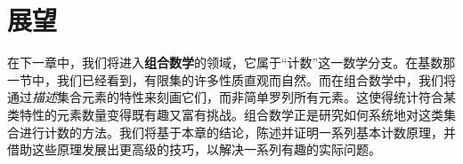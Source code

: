 \section{展望}

在下一章中，我们将进入\textbf{组合数学}的领域，它属于``计数''这一数学分支。在基数那一节中，我们已经看到，有限集的许多性质直观而自然。而在组合数学中，我们将通过\emph{描述}集合元素的特性来刻画它们，而非简单罗列所有元素。这使得统计符合某类特性的元素数量变得既有趣又富有挑战。组合数学正是研究如何系统地对这类集合进行计数的方法。我们将基于本章的结论，陈述并证明一系列基本计数原理，并借助这些原理发展出更高级的技巧，以解决一系列有趣的实际问题。
